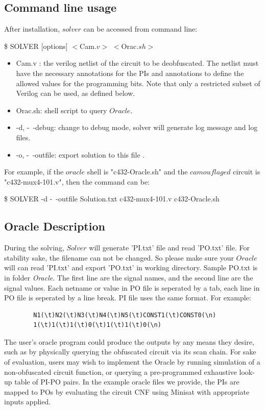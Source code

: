 \documentclass[proposal]{umassthesis}  %
\begin{document}
	\subsection{Command line usage}
		After installation, $solver$ can be accessed from command line:
		\newline
		\centerline{ \$ SOLVER [options] $<$Cam$.v>$ $<$Orac$.sh>$}
			\begin{itemize}
				\item Cam.v : the verilog netlist of the circuit to be deobfuscated. The netlist must have the necessary annotations for the PIs and annotations to define the allowed values for the programming bits. Note that only a restricted subset of Verilog can be used, as defined below.
				\item Orac.sh: shell script to query $Oracle$.
				\item -d, -\ -debug: change to debug mode, solver will generate log message and log files.
				\item -o, -\ -outfile: export solution to this file .
	 		\end{itemize}
		For example, if the $oracle$ shell is "c432-Oracle.sh" and the $camouflaged$ circuit is "c432-mux4-101.v", then the command can be:
		\newline
		\centerline{\$ SOLVER -d -\ -outfile Solution.txt c432-mux4-101.v c432-Oracle.sh }
		
	\subsection{Oracle Description}
	During the solving, $Solver$ will generate 'PI.txt' file and read 'PO.txt' file. For stability sake, the filename can not be changed. So please make sure your $Oracle$ will can read 'PI.txt' and export 'PO.txt' in working directory. Sample PO.txt is in folder \emph{Oracle}. The first line are the signal names, and the second line are the signal values. Each netname or value in PO file is seperated by a tab, each line in PO file is seperated by a line break. PI file uses the same format. For example:
	\begin{verbatim}
		N1(\t)N2(\t)N3(\t)N4(\t)N5(\t)CONST1(\t)CONST0(\n)
		1(\t)1(\t)1(\t)0(\t)1(\t)1(\t)0(\n)
	\end{verbatim}
	The user's oracle program could produce the outputs by any means they desire, such as by physically querying the obfuscated circuit via its scan chain. For sake of evaluation, users may wish to implement the Oracle by running simulation of a non-obfuscated circuit function, or querying a pre-programmed exhaustive look-up table of PI-PO pairs. In the example oracle files we provide, the PIs are mapped to POs by evaluating the circuit CNF using Minisat with appropriate inputs applied.	
	
\end{document}
